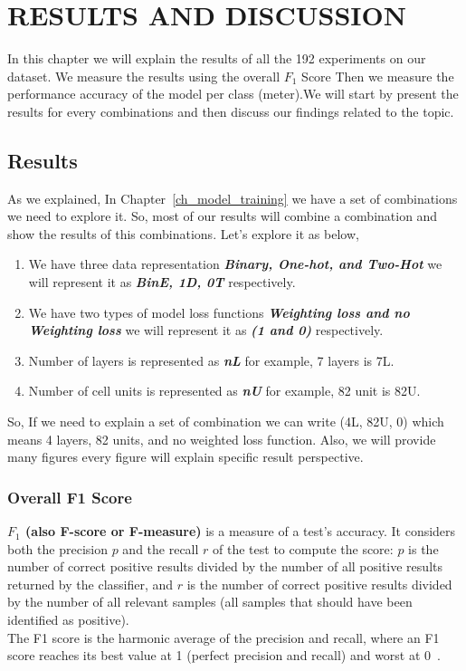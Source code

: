 \chapter{\uppercase{Results And Discussion}}\label{ch_results}

In this chapter we will explain the results of all the 192 experiments on our dataset. We measure the results using the overall $F_1$ Score Then we measure the performance accuracy of the model per class (meter).We will start by present the results for every combinations and then discuss our findings related to the topic.

\section{Results}

As we explained, In Chapter~\ref{ch_model_training} we have a set of combinations we need to explore it. So, most of our results will combine a combination and show the results of this combinations. Let's explore it as below,
\begin{enumerate}
\item  We have three data representation \textbf{\textit{Binary, One-hot, and Two-Hot}} we will represent it as \textbf{\textit{BinE, 1D, 0T}} respectively.
\item We have two types of model loss functions \textbf{\textit{Weighting loss and no Weighting loss}} we will represent it as \textbf{\textit{(1 and 0)}} respectively.
\item Number of layers is represented as \textbf{\textit{nL}} for example, 7 layers is 7L.
  \item Number of cell units is represented as \textbf{\textit{nU}} for example, 82 unit is 82U.
  \end{enumerate}

  So, If we need to explain a set of combination we can write (4L, 82U, 0) which means 4 layers, 82 units, and no weighted loss function. Also, we will provide many figures every figure will explain specific result perspective.
  
\subsection{Overall F1 Score}

\textbf{$F_1$ (also F-score or F-measure)} is a measure of a test's accuracy. It considers both the precision $p$ and the recall $r$ of the test to compute the score: $p$ is the number of correct positive results divided by the number of all positive results returned by the classifier, and $r$ is the number of correct positive results divided by the number of all relevant samples (all samples that should have been identified as positive).\\ The F1 score is the harmonic average of the precision and recall, where an F1 score reaches its best value at 1 (perfect precision and recall) and worst at 0~\cite{Wiki_f1_score}.


